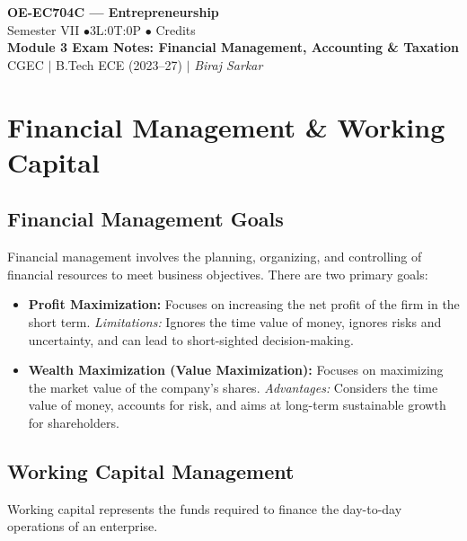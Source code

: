 \documentclass[12pt,a4paper]{article}
\begin{document}

\begin{center}
  {\LARGE\bfseries\color{myred} OE-EC704C --- Entrepreneurship}\\[5pt]
  {\normalsize\color{mydark} Semester VII \quad$\bullet$\quad 3L:0T:0P \quad$\bullet$ Credits}\\[3pt]
  {\normalsize\color{myteal}\textbf{Module 3 Exam Notes: Financial Management, Accounting \& Taxation}}\\[3pt]
  {\small\color{mydark} CGEC \;$|$\; B.Tech ECE (2023--27) \;$|$\; \textit{Biraj Sarkar}}
\end{center}
\vspace{2pt}
\noindent{\color{myred}\rule{\linewidth}{1.5pt}}
\vspace{2pt}

\hypersetup{linkcolor=mydark}
\tableofcontents
\hypersetup{linkcolor=myteal}
\newpage

\section{Financial Management \& Working Capital}

\subsection{Financial Management Goals}
Financial management involves the planning, organizing, and controlling of financial resources to meet business objectives. There are two primary goals:
\begin{itemize}[leftmargin=*, itemsep=3.5pt]
  \item \textbf{Profit Maximization:} Focuses on increasing the net profit of the firm in the short term.
    \textit{Limitations:} Ignores the time value of money, ignores risks and uncertainty, and can lead to short-sighted decision-making.
  \item \textbf{Wealth Maximization (Value Maximization):} Focuses on maximizing the market value of the company's shares.
    \textit{Advantages:} Considers the time value of money, accounts for risk, and aims at long-term sustainable growth for shareholders.
\end{itemize}

\subsection{Working Capital Management}
Working capital represents the funds required to finance the day-to-day operations of an enterprise.
\end{document}
